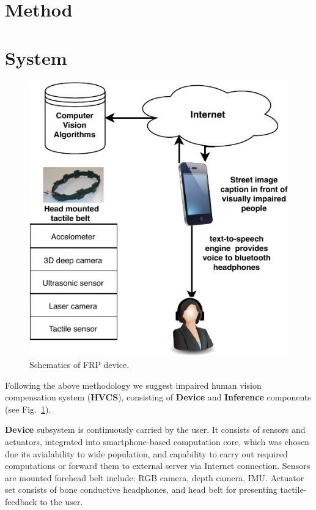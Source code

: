 \documentclass[a4paper,11pt]{article}
\begin{document}
\section{Method}
\label{sec:method}

\newpage
\section{System}
\label{sec:system}

\begin{figure}
  \begin{center}
    \includegraphics[scale=0.7]{./img/diagram.pdf}  
  \end{center}
  \caption{Schematics of FRP device.}
  \label{fig:schematics}
\end{figure}

Following the above methodology we suggest impaired human vision compensation system (\textbf{HVCS}), consisting of \textbf{Device} and \textbf{Inference} components (see Fig.~\ref{fig:schematics}).

\textbf{Device} subsystem is continuously carried by the user. It consists of sensors and actuators, integrated into smartphone-based computation core, which was chosen due its avialability to wide population, and capability to carry out required computations or forward them to external server via Internet connection. Sensors are mounted forehead belt include: RGB camera, depth camera, IMU. Actuator set consists of bone conductive headphones, and head belt for presenting tactile-feedback to the user. %
\end{document}
